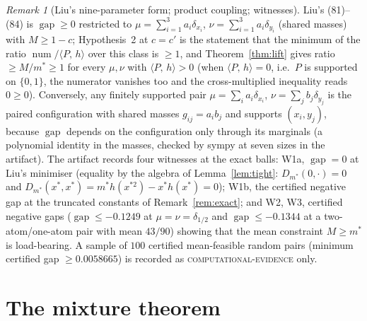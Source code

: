 \documentclass[11pt]{article}
\theoremstyle{plain}
\theoremstyle{definition}
\theoremstyle{remark}
\newtheorem{remark}[theorem]{Remark}
\newcommand{\pr}[2]{\langle #1,\,#2\rangle}
\newcommand{\gap}{\operatorname{gap}}
\newcommand{\num}{\operatorname{num}}
\newcommand{\lbl}[1]{\textsc{#1}}
\begin{document}
\begin{remark}[Liu's nine-parameter form; product coupling; witnesses]
Liu's (81)--(84) is $\gap\ge0$ restricted to
$\mu=\sum_{i=1}^3a_i\delta_{x_i}$, $\nu=\sum_{i=1}^3a_i\delta_{y_i}$ (shared
masses) with $M\ge1-c$; Hypothesis~2 at $c=c'$ is the statement that the
minimum of the ratio $\num/\pr{P}{h}$ over this class is $\ge1$, and
Theorem~\ref{thm:lift} gives ratio $\ge M/m^\ast\ge1$ for every $\mu,\nu$ with
$\pr{P}{h}>0$ (when $\pr{P}{h}=0$, i.e.\ $P$ is supported on $\{0,1\}$, the
numerator vanishes too and the cross-multiplied inequality reads $0\ge0$).
Conversely, any finitely supported pair $\mu=\sum_ia_i\delta_{x_i}$,
$\nu=\sum_jb_j\delta_{y_j}$ is the paired configuration with shared masses
$g_{ij}=a_ib_j$ and supports $(x_i,y_j)$, because $\gap$ depends on the
configuration only through its marginals (a polynomial identity in the
masses, checked by sympy at seven sizes in the artifact).  The artifact
records four witnesses at the exact balls: W1a, $\gap=0$ at Liu's minimiser
(equality by the algebra of Lemma~\ref{lem:tight}: $D_{m^\ast}(0,\cdot)=0$
and $D_{m^\ast}(x^\ast,x^\ast)=m^\ast h(x^{\ast2})-x^\ast h(x^\ast)=0$); W1b,
the certified negative gap at the truncated constants of
Remark~\ref{rem:exact}; and W2, W3, certified negative gaps
($\gap\le-0.1249$ at $\mu=\nu=\delta_{1/2}$ and $\gap\le-0.1344$ at a
two-atom/one-atom pair with mean $43/90$) showing that the mean constraint
$M\ge m^\ast$ is load-bearing.  A sample of $100$ certified mean-feasible
random pairs (minimum certified gap $\ge0.0058665$) is recorded as
\lbl{computational-evidence} only.
\end{remark}

\section{The mixture theorem}\label{sec:mixture}
\end{document}
